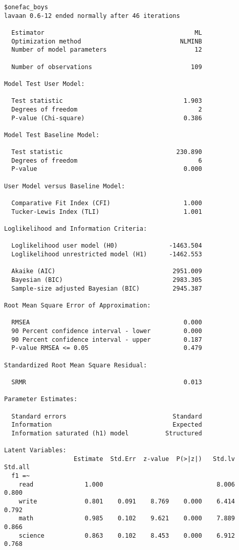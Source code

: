 \documentclass[
  letterpaper,
  DIV=11,
  numbers=noendperiod]{scrreprt}
\begin{document}
\begin{verbatim}
$onefac_boys
lavaan 0.6-12 ended normally after 46 iterations

  Estimator                                         ML
  Optimization method                           NLMINB
  Number of model parameters                        12

  Number of observations                           109

Model Test User Model:
                                                      
  Test statistic                                 1.903
  Degrees of freedom                                 2
  P-value (Chi-square)                           0.386

Model Test Baseline Model:

  Test statistic                               230.890
  Degrees of freedom                                 6
  P-value                                        0.000

User Model versus Baseline Model:

  Comparative Fit Index (CFI)                    1.000
  Tucker-Lewis Index (TLI)                       1.001

Loglikelihood and Information Criteria:

  Loglikelihood user model (H0)              -1463.504
  Loglikelihood unrestricted model (H1)      -1462.553
                                                      
  Akaike (AIC)                                2951.009
  Bayesian (BIC)                              2983.305
  Sample-size adjusted Bayesian (BIC)         2945.387

Root Mean Square Error of Approximation:

  RMSEA                                          0.000
  90 Percent confidence interval - lower         0.000
  90 Percent confidence interval - upper         0.187
  P-value RMSEA <= 0.05                          0.479

Standardized Root Mean Square Residual:

  SRMR                                           0.013

Parameter Estimates:

  Standard errors                             Standard
  Information                                 Expected
  Information saturated (h1) model          Structured

Latent Variables:
                   Estimate  Std.Err  z-value  P(>|z|)   Std.lv  Std.all
  f1 =~                                                                 
    read              1.000                               8.006    0.800
    write             0.801    0.091    8.769    0.000    6.414    0.792
    math              0.985    0.102    9.621    0.000    7.889    0.866
    science           0.863    0.102    8.453    0.000    6.912    0.768


\end{verbatim}
\end{document}
